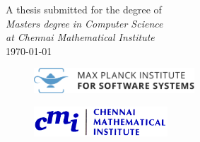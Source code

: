 \begin{titlepage}
{\large A thesis submitted for the degree of}\\[0.5cm]
{\large \emph{Masters degree in Computer Science\\at Chennai Mathematical Institute  }}\\[0.5cm]
{\large \today}\\[2cm] %

\begin{figure}[h!]
\begin{minipage}{0.4\textwidth}
\begin{flushleft}
\includegraphics[width=6cm]{mpi-logo.png}\\[1cm] 
\end{flushleft}
\end{minipage}
\begin{minipage}{0.5\textwidth}
\begin{flushright}
\includegraphics[width=5cm]{cmi-logo.png}\\[1cm]
\end{flushright}
\end{minipage}
\end{figure}

\end{titlepage}